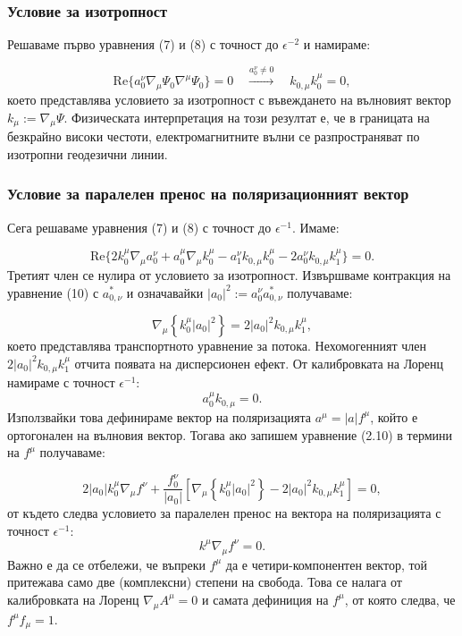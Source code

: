 \subsubsection{Условие за изотропност}

Решаваме първо уравнения (7) и (8) с точност до $\epsilon^{-2}$ и намираме:

\begin{equation}
	\text{Re}\big\{a^\nu_0\nabla_\mu\Psi_0\nabla^\mu\Psi_0\big\} = 0\quad \xrightarrow{a^\nu_0\ne 0}\quad k_{0,\mu} k^\mu_0 = 0,
\end{equation}
което представлява условието за изотропност с въвеждането на вълновият вектор $k_\mu := \nabla_\mu\Psi$. Физическата интерпретация на този резултат е, че в границата на безкрайно високи честоти, електромагнитните вълни се разпространяват по изотропни геодезични линии.

\subsubsection{Условие за паралелен пренос на поляризационният вектор}

Сега решаваме уравнения (7) и (8) с точност до $\epsilon^{-1}$. Имаме:

\begin{equation}
	\text{Re}\big\{2 k_0^\mu\nabla_\mu a_0^\nu + a_0^\mu\nabla_\mu k^\mu_0 - a_1^\nu k_{0,\mu} k^\mu_0 - 2 a_0^\nu k_{0,\mu}k^\mu_1\big\} = 0.
\end{equation}
Третият член се нулира от условието за изотропност. Извършваме контракция на уравнение (10) с $a^*_{0,\nu}$ и означавайки $|a_0|^2 := a^\nu_0 a^*_{0,\nu}$ получаваме:

\begin{equation}
	\nabla_\mu\left\{k_0^\mu |a_0|^2\right\} = 2  |a_0|^2 k_{0,\mu}k_1^\mu,
\end{equation}
което представлява транспортното уравнение за потока. Нехомогенният член $2  |a_0|^2 k_{0,\mu}k_1^\mu$ отчита появата на дисперсионен ефект.
От калибровката на Лоренц намираме с точност $\epsilon^{-1}$:
\begin{equation}\label{a_orthog_k}
	a_0^\mu k_{0,\mu} = 0.
\end{equation}
Използвайки това дефинираме вектор на поляризацията $a^\mu = |a|f^\mu$, който е ортогонален на вълновия вектор. Тогава ако запишем уравнение (2.10) в термини на $f^\mu$ получаваме:

\begin{equation}
	2|a_0|k_0^\mu\nabla_\mu f^\nu + \frac{f^\nu_0}{|a_0|}\left[\nabla_\mu\left\{k_0^\mu |a_0|^2\right\} - 2  |a_0|^2 k_{0,\mu}k_1^\mu\right] = 0,
\end{equation}
от където следва условието за паралелен пренос на вектора на поляризацията с точност $\epsilon^{-1}$:
\begin{equation}
	k^\mu\nabla_\mu f^\nu = 0.
\end{equation}
Важно е да се отбележи, че въпреки $f^\mu$ да е четири-компонентен вектор, той притежава само две (комплексни) степени на свобода. Това се налага от калибровката на Лоренц $\nabla_\mu A^\mu = 0$ и самата дефиниция на $f^\mu$, от която следва, че $f^\mu f_\mu = 1$.

